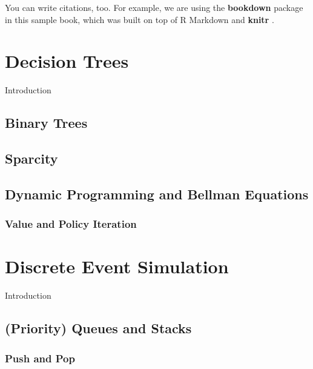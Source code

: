 \documentclass[]{book}
\begin{document}
You can write citations, too. For example, we are using the \textbf{bookdown} package \citep{R-bookdown} in this sample book, which was built on top of R Markdown and \textbf{knitr} \citep{xie2015}.

\hypertarget{decisiontrees}{%
\chapter{Decision Trees}\label{decisiontrees}}

Introduction

\hypertarget{binary-trees}{%
\section{Binary Trees}\label{binary-trees}}

\hypertarget{sparcity}{%
\section{Sparcity}\label{sparcity}}

\hypertarget{dynamic-programming-and-bellman-equations}{%
\section{Dynamic Programming and Bellman Equations}\label{dynamic-programming-and-bellman-equations}}

\hypertarget{value-and-policy-iteration}{%
\subsection{Value and Policy Iteration}\label{value-and-policy-iteration}}

\hypertarget{discrete-event-simulation}{%
\chapter{Discrete Event Simulation}\label{discrete-event-simulation}}

Introduction

\hypertarget{priority-queues-and-stacks}{%
\section{(Priority) Queues and Stacks}\label{priority-queues-and-stacks}}

\hypertarget{push-and-pop}{%
\subsection{Push and Pop}\label{push-and-pop}}
\end{document}
